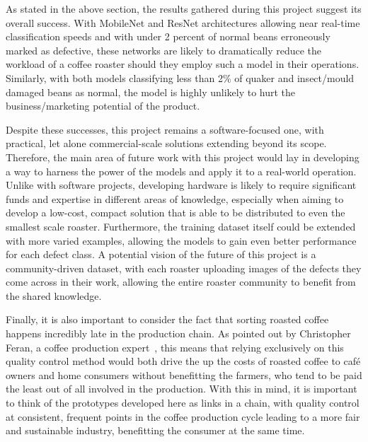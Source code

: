 As stated in the above section, the results gathered during this project suggest its overall success.
With MobileNet and ResNet architectures allowing near real-time classification speeds and with under 2 percent of normal beans
erroneously marked as defective, these networks are likely to dramatically reduce the workload of a coffee roaster should they employ such
a model in their operations.
Similarly, with both models classifying less than 2\% of quaker and insect/mould damaged beans as normal,
the model is highly unlikely to hurt the business/marketing potential of the product.

Despite these successes, this project remains a software-focused one, with practical, let alone commercial-scale solutions
extending beyond its scope.
Therefore, the main area of future work with this project would lay in developing a way to harness the power of the models
and apply it to a real-world operation.
Unlike with software projects, developing hardware is likely to require significant funds and expertise in different areas of knowledge,
especially when aiming to develop a low-cost, compact solution that is able to be distributed to even the smallest scale roaster.
Furthermore, the training dataset itself could be extended with more varied examples, allowing the models to gain even better
performance for each defect class.
A potential vision of the future of this project is a community-driven dataset, with each roaster uploading images of the defects
they come across in their work, allowing the entire roaster community to benefit from the shared knowledge.

Finally, it is also important to consider the fact that sorting roasted coffee happens incredibly late in the production chain.
As pointed out by Christopher Feran, a coffee production expert~\cite{ferranCoffeeEthics}, this means that relying exclusively on
this quality control method would both drive the up the costs of roasted coffee to café owners and home consumers without benefitting the
farmers, who tend to be paid the least out of all involved in the production.
With this in mind, it is important to think of the prototypes developed here as links in a chain, with quality control at
consistent, frequent points in the coffee production cycle leading to a more fair and sustainable industry, benefitting the
consumer at the same time.
